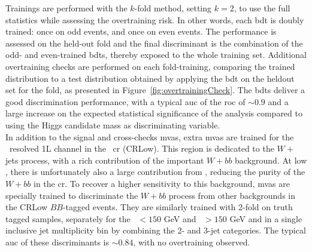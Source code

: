 Trainings are performed with the $k$-fold method, setting $k = 2$, to use the full statistics while assessing the overtraining risk. In other words, each \gls{bdt} is doubly trained: once on odd events, and once on even events. The performance is assessed on the held-out fold and the final discriminant is the combination of the odd- and even-trained \gls{bdt}s, thereby exposed to the whole training set. Additional overtraining checks are performed on each fold-training, comparing the trained distribution to a test distribution obtained by applying the \gls{bdt} on the heldout set for the fold, as presented in Figure~\ref{fig:overtrainingCheck}. The \gls{bdt}s deliver a good discrimination performance, with a typical \gls{auc} of the \gls{roc} of $\sim0.9$ and a large increase on the expected statistical significance of the analysis compared to using the Higgs candidate mass as discriminating variable. \\
  
In addition to the signal and cross-checks \gls{mva}s, extra \gls{mva}s are trained for the \vhb\ resolved 1L channel in the \lowdr\ \gls{cr} (CRLow). This region is dedicated to the $W+$jets process, with a rich contribution of the important $W+bb$ background. At low \ptv, there is unfortunately also a large contribution from \ttb, reducing the purity of the $W+bb$ in the \gls{cr}. To recover a higher sensitivity to this background, \gls{mva}s are specially trained to discriminate the $W+bb$ process from other backgrounds in the CRLow $BB$-tagged events. They are similarly trained with 2-fold on truth tagged samples, separately for the \ptv\ $< 150$ GeV and \ptv\ $> 150$ GeV and in a single inclusive jet multiplicity bin by combining the 2- and 3-jet categories. The typical \gls{auc} of these discriminants is $\sim0.84$, with no overtraining observed.

